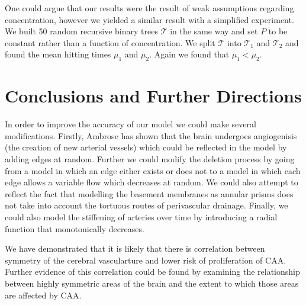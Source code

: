 \documentclass[12pt]{article} %
\theoremstyle{definition}
\begin{document}
One could argue that our results were the result of weak assumptions regarding concentration, however we yielded a similar result with a simplified experiment.  We built 50 random recursive binary trees $\mathcal{T}$ in the same way and set $P$ to be constant rather than a function of concentration.  We split $\mathcal{T}$ into $\mathcal{T}_{1}$ and $\mathcal{T}_{2}$ and found the mean hitting times $\mu_{1}$ and $\mu_{2}$.  Again we found that $\mu_{1} < \mu_{2}$.  

\section{Conclusions and Further Directions}
In order to improve the accuracy of our model we could make several modifications.  Firstly, Ambrose has shown that the brain undergoes angiogenisis  (the creation of new arterial vessels) which could be reflected in the model by adding edges at random.  Further we could modify the deletion process by going from a model in which an edge either exists or does not to a model in which each edge allows a variable flow which decreases at random.  We could also attempt to reflect the fact that modelling the basement membranes as annular prisms does not take into account the tortuous routes of perivascular drainage.  Finally, we could also model the stiffening of arteries over time  by introducing a radial function that monotonically decreases.

We have demonstrated that it is likely that there is correlation between symmetry of the cerebral vascularture and lower risk of proliferation of CAA.  Further evidence of this correlation could be found by examining the relationship between highly symmetric areas of the brain and the extent to which those areas are affected by CAA.  


%


\end{document}
